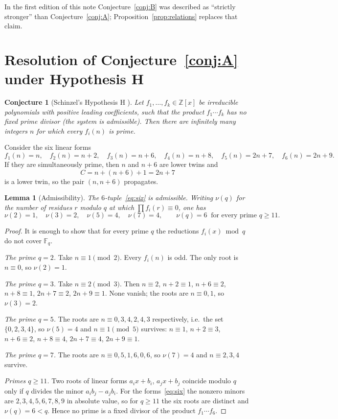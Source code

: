 \documentclass[11pt,a4paper]{article}
\newtheorem{lemma}[theorem]{Lemma}
\newtheorem{conjecture}[theorem]{Conjecture}
\theoremstyle{definition}
\theoremstyle{remark}
\newcommand{\F}{\mathbb{F}}
\newcommand{\Z}{\mathbb{Z}}
\begin{document}
In the first edition of this note Conjecture~\ref{conj:B} was described as ``strictly stronger'' than Conjecture~\ref{conj:A}; Proposition~\ref{prop:relations} replaces that claim.

\section{Resolution of Conjecture~\ref{conj:A} under Hypothesis H}\label{sec:A}

\begin{conjecture}[Schinzel's Hypothesis H \cite{Schinzel}]\label{conj:H}
Let $f_1,\dots,f_k\in\Z[x]$ be irreducible polynomials with positive leading coefficients, such that the product $f_1\cdots f_k$ has no fixed prime divisor (the system is \emph{admissible}).
Then there are infinitely many integers $n$ for which every $f_i(n)$ is prime.
\end{conjecture}

Consider the six linear forms
\begin{equation}\label{eq:six}
f_1(n) = n,\quad f_2(n) = n+2,\quad f_3(n) = n+6,\quad f_4(n) = n+8,\quad f_5(n) = 2n+7,\quad f_6(n) = 2n+9 .
\end{equation}
If they are simultaneously prime, then $n$ and $n+6$ are lower twins and
\[
C = n + (n+6) + 1 = 2n+7
\]
is a lower twin, so the pair $(n,n+6)$ propagates.

\begin{lemma}[Admissibility]\label{lem:adm}
The $6$-tuple~\eqref{eq:six} is admissible.
Writing $\nu(q)$ for the number of residues $r$ modulo $q$ at which $\prod f_i(r)\equiv 0$, one has
\[
\nu(2) = 1,\quad \nu(3) = 2,\quad \nu(5) = 4,\quad \nu(7) = 4,\qquad \nu(q) = 6\ \text{ for every prime } q\ge 11 .
\]
\end{lemma}

\begin{proof}
It is enough to show that for every prime $q$ the reductions $f_i(x) \bmod q$ do not cover $\F_q$.

\emph{The prime $q=2$.} Take $n\equiv 1\pmod 2$. Every $f_i(n)$ is odd. The only root is $n\equiv 0$, so $\nu(2)=1$.

\emph{The prime $q=3$.} Take $n\equiv 2\pmod 3$. Then
$n\equiv 2$, $n+2\equiv 1$, $n+6\equiv 2$, $n+8\equiv 1$, $2n+7\equiv 2$, $2n+9\equiv 1$.
None vanish; the roots are $n\equiv 0,1$, so $\nu(3)=2$.

\emph{The prime $q=5$.} The roots are $n\equiv 0, 3, 4, 2, 4, 3$ respectively, i.e.\ the set $\{0,2,3,4\}$, so $\nu(5)=4$ and $n\equiv 1\pmod 5$ survives:
$n\equiv 1$, $n+2\equiv 3$, $n+6\equiv 2$, $n+8\equiv 4$, $2n+7\equiv 4$, $2n+9\equiv 1$.

\emph{The prime $q=7$.} The roots are $n\equiv 0,5,1,6,0,6$, so $\nu(7)=4$ and $n\equiv 2,3,4$ survive.

\emph{Primes $q\ge 11$.} Two roots of linear forms $a_ix+b_i$, $a_jx+b_j$ coincide modulo $q$ only if $q$ divides the minor $a_ib_j-a_jb_i$.
For the forms~\eqref{eq:six} the nonzero minors are $2,3,4,5,6,7,8,9$ in absolute value, so for $q\ge 11$ the six roots are distinct and $\nu(q)=6<q$.
Hence no prime is a fixed divisor of the product $f_1\cdots f_6$.
\end{proof}
\end{document}
